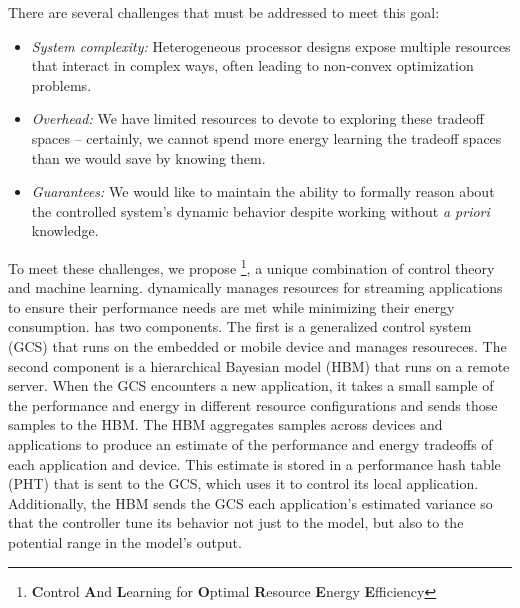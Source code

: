 There are several challenges that must be addressed to meet this goal:
\begin{itemize}
\item \textit{System complexity:} Heterogeneous processor designs
  expose multiple resources that interact in complex ways, often
  leading to non-convex optimization problems.
\item \textit{Overhead:} We have limited resources to devote to
  exploring these tradeoff spaces -- certainly, we cannot spend more
  energy learning the tradeoff spaces than we would save by knowing
  them.
\item \textit{Guarantees:} We would like to maintain the ability to
  formally reason about the controlled system's dynamic behavior
  despite working without \emph{a priori} knowledge.
\end{itemize}


To meet these challenges, we propose
\SYSTEM{}\footnote{\textbf{C}ontrol \textbf{A}nd \textbf{L}earning for
  \textbf{O}ptimal \textbf{R}esource \textbf{E}nergy
  \textbf{E}fficiency}, a unique combination of control theory and
machine learning.  \SYSTEM{} dynamically manages resources for
streaming applications to ensure their performance needs are met while
minimizing their energy consumption.  \SYSTEM{} has two components.
The first is a generalized control system (GCS) that runs on the
embedded or mobile device and manages resoureces.  The second
component is a hierarchical Bayesian model (HBM) that runs on a remote
server.  When the GCS encounters a new application, it takes a small
sample of the performance and energy in different resource
configurations and sends those samples to the HBM.  The HBM aggregates
samples across devices and applications to produce an estimate of the
performance and energy tradeoffs of each application and device.  This
estimate is stored in a performance hash table (PHT) that is sent to
the GCS, which uses it to control its local application.
Additionally, the HBM sends the GCS each application's estimated
variance so that the controller tune its behavior not just to the
model, but also to the potential range in the model's output.

